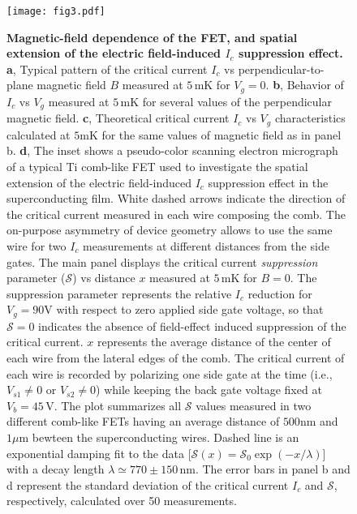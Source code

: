 \documentclass[prl,twocolumn,reprint,graphicx,showpacs,superscriptaddress,floatfix]{revtex4-1}
\begin{document}
\begin{figure}[t!]
\begin{center}
\texttt{[image: fig3.pdf]}\vspace{-3mm}
\caption{\textbf{Magnetic-field dependence of the FET, and spatial extension of the electric field-induced $I_c$ suppression effect.} 
\textbf{a}, Typical pattern of the critical current $I_c$ vs perpendicular-to-plane magnetic field $B$ measured at $5\,$mK for $V_g=0$.
\textbf{b}, Behavior of $I_c$ vs $V_g$ measured at $5\,$mK for several values of the perpendicular magnetic field. 
\textbf{c},  Theoretical critical current $I_c$ vs $V_g$ characteristics calculated at $5$mK for the same values of magnetic field as in panel b.
\textbf{d}, The inset shows a pseudo-color scanning electron micrograph of a typical  Ti comb-like FET used to investigate the spatial extension of the electric field-induced $I_c$ suppression effect in the superconducting film. White dashed arrows indicate the direction of the critical current measured in each wire composing the comb.
The on-purpose asymmetry of device geometry allows to use the same wire for two $I_c$ measurements at different distances from the side gates.
The main panel displays the critical current \emph{suppression} parameter  ($\mathcal{S}$) vs distance $x$ measured at $5\,$mK for $B=0$. 
The suppression parameter represents the relative $I_c$ reduction for $V_g=90$V with respect to zero applied side gate voltage, so that $\mathcal{S}=0$ indicates the absence of field-effect induced suppression  of the critical current.
$x$ represents the average distance of the center of each wire 
 from the lateral edges of the comb. 
The critical current of each wire is recorded by polarizing one side gate at the time (i.e., $V_{s1}\neq 0$ or $V_{s2}\neq 0$) while keeping the back gate voltage fixed at $V_b=45\,$V. 
The plot summarizes all $\mathcal{S}$ values measured in two different comb-like FETs having  an average distance of  $500$nm and $1\mu$m bewteen the superconducting wires.
Dashed line is an exponential damping fit to the data [$\mathcal{S}(x)=\mathcal{S}_0 \exp (-x/\lambda)$] with a decay length $\lambda \simeq 770\pm 150\,$nm. 
The error bars in panel b and d represent the standard deviation of the critical current $I_c$ and $\mathcal{S}$, respectively, calculated over 50 measurements.
}
\label{fig3}
\end{center}
\end{figure}
\end{document}

